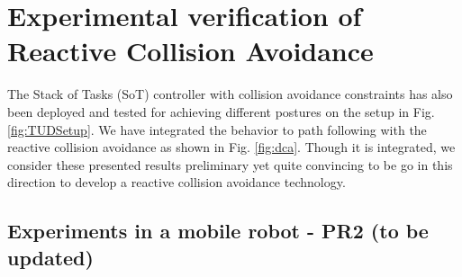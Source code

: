 
\section{Experimental verification of Reactive Collision Avoidance}
The Stack of Tasks (SoT) controller with collision avoidance constraints has also been deployed and tested for achieving different postures on the setup in Fig. \ref{fig:TUDSetup}. We have integrated the behavior to path following with the reactive collision avoidance as shown in Fig. \ref{fig:dca}. Though it is integrated, we consider these presented results preliminary yet quite convincing to be go in this direction to develop a reactive collision avoidance technology.

\subsection{Experiments in a mobile robot - PR2{\color{red}  (to be updated)}}

